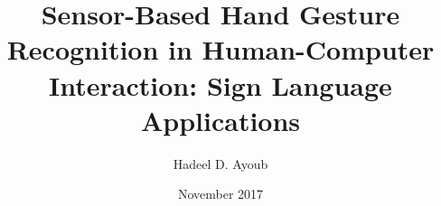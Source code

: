 \documentclass[a4paper,11pt]{report}
\begin{document}
\author{Hadeel D. Ayoub}
\title{
    Sensor-Based Hand Gesture Recognition in Human-Computer Interaction: Sign Language Applications}
\date{November 2017}

\maketitle

\tableofcontents



\printbibliography
\end{document}
